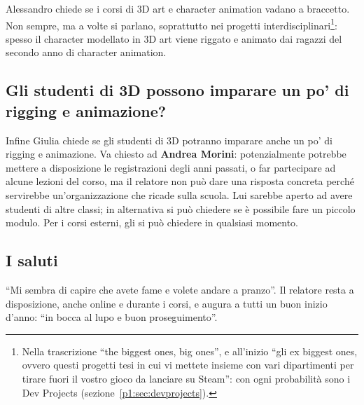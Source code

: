 Alessandro chiede se i corsi di 3D art e character animation vadano a
braccetto. Non sempre, ma a volte si parlano, soprattutto nei progetti
interdisciplinari\footnote{Nella trascrizione ``the biggest ones, big ones'',
e all'inizio ``gli ex biggest ones, ovvero questi progetti tesi in cui vi
mettete insieme con vari dipartimenti per tirare fuori il vostro gioco da
lanciare su Steam'': con ogni probabilità sono i Dev Projects
(sezione~\ref{p1:sec:devprojects}).}: spesso il character modellato in 3D art
viene riggato e animato dai ragazzi del secondo anno di character animation.

\subsection{Gli studenti di 3D possono imparare un po' di rigging e animazione?}

Infine Giulia chiede se gli studenti di 3D potranno imparare anche un po' di
rigging e animazione. Va chiesto ad \textbf{Andrea Morini}: potenzialmente
potrebbe mettere a disposizione le registrazioni degli anni passati, o far
partecipare ad alcune lezioni del corso, ma il relatore non può dare una
risposta concreta perché servirebbe un'organizzazione che ricade sulla
scuola. Lui sarebbe aperto ad avere studenti di altre classi; in alternativa
si può chiedere se è possibile fare un piccolo modulo. Per i corsi esterni,
gli si può chiedere in qualsiasi momento.

\subsection{I saluti}

``Mi sembra di capire che avete fame e volete andare a pranzo''. Il relatore
resta a disposizione, anche online e durante i corsi, e augura a tutti un buon
inizio d'anno: ``in bocca al lupo e buon proseguimento''.
